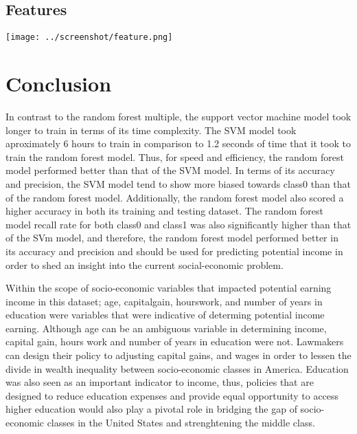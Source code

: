 \documentclass[12pt]{article}
\begin{document}
\begin{multicols*}{2}
	\subsection{Features}
	\begin{center}
	\texttt{[image: ../screenshot/feature.png]}
	\end{center}


	\section{Conclusion}
	\hspace*{5mm} In contrast to the random forest multiple, the support vector machine model took longer to train in terms of its time complexity. The SVM model took aproximately 6 hours to train in comparison to 1.2 seconds of time that it 
    took to train the random forest model. Thus, for speed and efficiency, the random forest model performed better than that of the SVM model. In terms of its accuracy and precision, the SVM model tend to show more biased towards class0 than that
	of the random forest model. Additionally, the random forest model also scored a higher accuracy in both its training and testing dataset. The random forest model recall rate for both class0 and class1 was also significantly
	higher than that of the SVm model, and therefore, the random forest model performed better in its accuracy and precision and should be used for predicting potential income in order to shed an insight into the current social-economic problem. 

	\hspace*{5mm} Within the scope of socio-economic variables that impacted potential earning income in this dataset; age, capitalgain, hourswork, and number of years in education were variables that were indicative of determing potential income earning. Although age can be an ambiguous variable in determining income, 
	capital gain, hours work and number of years in education were not. Lawmakers can design their policy to adjusting capital gains, and wages in order to lessen the divide in wealth inequality between socio-economic classes in America. Education was also seen as an important
	indicator to income, thus, policies that are designed to reduce education expenses and provide equal opportunity to access higher education would also play a pivotal role in bridging the gap of socio-economic classes in the United States 
	and strenghtening the middle class. 

\end{multicols*}
\end{document}
